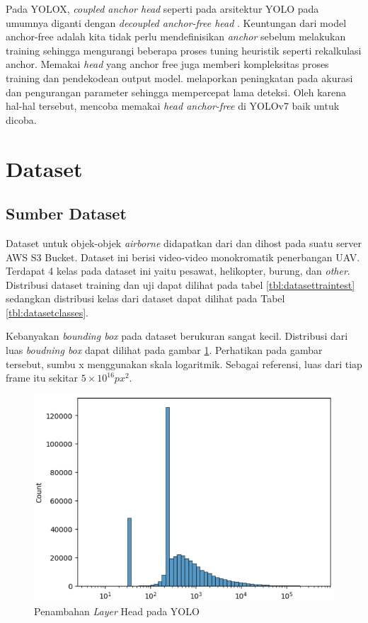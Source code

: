     Pada YOLOX, \emph{coupled anchor head} seperti pada arsitektur YOLO pada umumnya diganti dengan \emph{decoupled anchor-free head} \parencite{yolox}.
    Keuntungan dari model anchor-free adalah kita tidak perlu mendefinisikan \emph{anchor} sebelum melakukan training sehingga mengurangi beberapa proses
    tuning heuristik seperti rekalkulasi anchor. Memakai \emph{head} yang anchor free juga memberi kompleksitas proses training dan pendekodean output model.
    \cite{yolox} melaporkan peningkatan pada akurasi dan pengurangan parameter sehingga mempercepat lama deteksi.
    Oleh karena hal-hal tersebut, mencoba memakai \emph{head anchor-free} di YOLOv7 baik untuk dicoba.
    
    
\section{Dataset}
\label{section:dataset}

  \subsection{Sumber Dataset}
    Dataset untuk objek-objek \emph{airborne} didapatkan dari \textcite{aot_dataset} dan dihost pada suatu server AWS S3 Bucket.
    Dataset ini berisi video-video monokromatik penerbangan UAV.
    Terdapat 4 kelas pada dataset ini yaitu pesawat, helikopter, burung, dan \emph{other}.
    Distribusi dataset training dan uji dapat dilihat pada tabel \ref{tbl:datasettraintest} sedangkan distribusi kelas dari dataset dapat dilihat pada Tabel \ref{tbl:datasetclasses}.
    
    
    Kebanyakan \emph{bounding box} pada dataset berukuran sangat kecil.
    Distribusi dari luas \emph{boudning box} dapat dilihat pada gambar \ref{fig:areadist}.
    Perhatikan pada gambar tersebut, sumbu x menggunakan skala logaritmik.
    Sebagai referensi, luas dari tiap frame itu sekitar $5\times10^16 px^2$.
    \begin{figure}[H]
      \centering
      \includegraphics[scale=0.65]{figures/area-dist.png}
      \caption{Penambahan \emph{Layer} Head pada YOLO}
      \label{fig:areadist}
    \end{figure}

